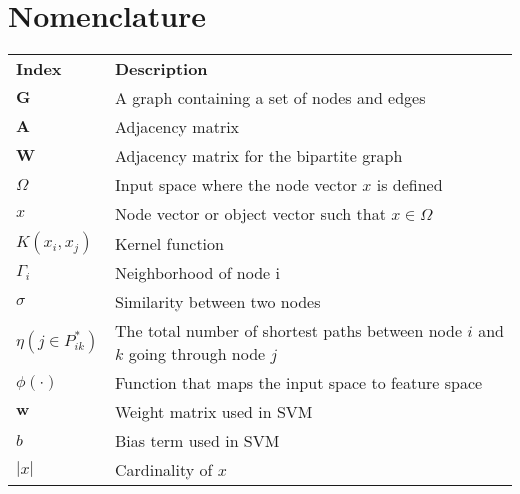 \chapter*{Nomenclature}

{\centering
\begin{longtabu}{X[2cm,l] X[8cm,p,l]}


\\
\textbf{Index} & \textbf{Description}\\
$\textbf{G}$ & A graph containing a set of nodes and edges\\
$\textbf{A}$ & Adjacency matrix\\
$\textbf{W}$ & Adjacency matrix for the bipartite graph\\
$\Omega$ & Input space where the node vector $x$ is defined\\
$x$ & Node vector or object vector such that $x \in \Omega$\\
$K(x_i,x_j)$ & Kernel function\\
$\Gamma_i$ & Neighborhood of node i\\
$\sigma$ & Similarity between two nodes\\
$\eta(j\in P_{ik}^*)$ & The total number of shortest paths between node $i$ and $k$ going through node $j$\\
$\phi(\cdot)$ & Function that maps the input space to feature space\\
$\bm{w}$ & Weight matrix used in SVM\\
$b$ & Bias term used in SVM\\
$|x|$ & Cardinality of $x$


\end{longtabu}}

